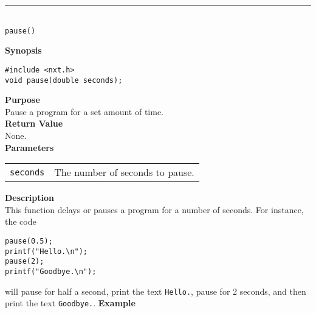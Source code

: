 \noindent
\vspace{5pt}
\rule{4.5in}{0.015in}\\
\noindent
{\LARGE \texttt{pause()}}\\
{}

\noindent
{\bf Synopsis}
\vspace{-8pt}
\begin{verbatim}
#include <nxt.h>
void pause(double seconds);
\end{verbatim}

\noindent
{\bf Purpose}\\
Pause a program for a set amount of time.\\

\noindent
{\bf Return Value}\\
None.\\

\noindent
{\bf Parameters}
\vspace{-0.1in}
\begin{description}
\item               
\begin{tabular}{p{15 mm}p{145 mm}}
\texttt{seconds} & The number of seconds to pause. \\
\end{tabular}
\end{description}

\noindent
{\bf Description}\\
This function delays or pauses a program for a number of seconds. For instance, 
the code 
\begin{verbatim}
pause(0.5);
printf("Hello.\n");
pause(2);
printf("Goodbye.\n");
\end{verbatim}
will pause for half a second, print the text \texttt{Hello.}, pause for 2 seconds,
and then print the text \texttt{Goodbye.}. 
\noindent
{\bf Example}\\


